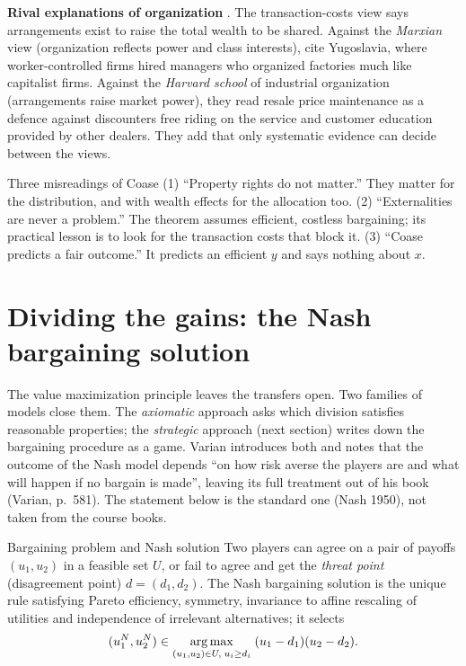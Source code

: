 \textbf{Rival explanations of organization} . The transaction-costs view says
arrangements exist to raise the total wealth to be shared. Against the \emph{Marxian} view
(organization reflects power and class interests), \MR{} cite Yugoslavia, where worker-controlled
firms hired managers who organized factories much like capitalist firms. Against the
\emph{Harvard school} of industrial organization (arrangements raise market power), they read
resale price maintenance as a defence against discounters free riding on the service and customer
education provided by other dealers. They add that only systematic evidence can decide between
the views.

\begin{caution}{Three misreadings of Coase}
(1) ``Property rights do not matter.'' They matter for the distribution, and with wealth effects
for the allocation too. (2) ``Externalities are never a problem.'' The theorem assumes efficient,
costless bargaining; its practical lesson is to look for the transaction costs that block it.
(3) ``Coase predicts a fair outcome.'' It predicts an efficient $y$ and says nothing about $x$.
\end{caution}

\section{Dividing the gains: the Nash bargaining solution}\label{sec:b-nash}

The value maximization principle leaves the transfers open. Two families of models close them.
The \emph{axiomatic} approach asks which division satisfies reasonable properties; the
\emph{strategic} approach (next section) writes down the bargaining procedure as a game. Varian
introduces both and notes that the outcome of the Nash model depends ``on how risk averse the
players are and what will happen if no bargain is made'', leaving its full treatment out of his
book (Varian, p.~581). The statement below is the standard one (Nash 1950), not taken from the
course books.

\begin{defn}{Bargaining problem and Nash solution}
Two players can agree on a pair of payoffs $(u_1, u_2)$ in a feasible set $U$, or fail to agree
and get the \emph{threat point} (disagreement point) $d = (d_1, d_2)$. The Nash bargaining
solution is the unique rule satisfying Pareto efficiency, symmetry, invariance to affine
rescaling of utilities and independence of irrelevant alternatives; it selects
\[
  (u_1^N, u_2^N) \in \operatorname*{arg\,max}_{(u_1, u_2) \in U,\; u_i \ge d_i} \; (u_1 - d_1)(u_2 - d_2).
\]
\end{defn}

